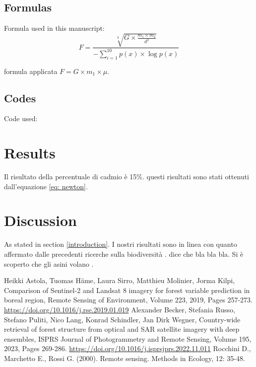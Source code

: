 \documentclass[a4paper, 12pt]{article}
\begin{document}
\subsection{Formulas}
Formula used in this manuscript:
\begin{equation}
F = \frac {\sqrt[3]{G \times \frac{m_{1} \times m_{2}}{d^{2}}}}{-\sum_{i=1}^{10}{p(x) \times \log{p(x)}}}
\label{eq: newton}
\end{equation}

formula applicata $F = G \times m_{1} \times \mu$.

\subsection{Codes}
Code used:

\section{Results}
Il risultato della percentuale di cadmio è 15\%.
questi risultati sono stati ottenuti dall'equazione \ref{eq: newton}.

\section{Discussion}
As stated in section \ref{introduction}.
I nostri risultati sono in linea con quanto affermato dalle precedenti ricerche sulla biodiversità \citep{Rocchini_2000, Becker_2023}.
\citet{Rocchini_2000} dice che bla bla bla.
Si è scoperto che gli asini volano \citep{Astola_2019}.



\begin{thebibliography}{999}
Heikki Astola, Tuomas Häme, Laura Sirro, Matthieu Molinier, Jorma Kilpi,
Comparison of Sentinel-2 and Landsat 8 imagery for forest variable prediction in boreal region,
Remote Sensing of Environment,
Volume 223,
2019,
Pages 257-273.
\url{https://doi.org/10.1016/j.rse.2019.01.019}
Alexander Becker, Stefania Russo, Stefano Puliti, Nico Lang, Konrad Schindler, Jan Dirk Wegner,
Country-wide retrieval of forest structure from optical and SAR satellite imagery with deep ensembles,
ISPRS Journal of Photogrammetry and Remote Sensing,
Volume 195,
2023,
Pages 269-286.
\url{https://doi.org/10.1016/j.isprsjprs.2022.11.011}
Rocchini D., Marchetto E., Rossi G. (2000). Remote sensing. Methods in Ecology, 12: 35-48.
\end{thebibliography}
\end{document}
